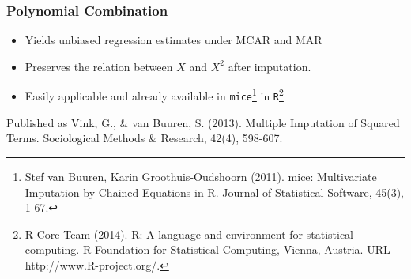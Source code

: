 \documentclass{beamer}
\begin{document}
\begin{frame}
  \frametitle{Polynomial Combination}
    \begin{itemize}
  \item Yields unbiased regression estimates under MCAR and MAR
  \item Preserves the relation between $X$ and $X^2$ after imputation. 
  \item Easily applicable and already available in \texttt{mice}\footnote{ \tiny Stef van Buuren, Karin Groothuis-Oudshoorn (2011). mice: Multivariate Imputation by Chained Equations in R. Journal of Statistical Software, 45(3), 1-67.} in \texttt{R}\footnote{ \tiny R Core Team (2014). R: A language and environment for statistical computing. R Foundation for Statistical Computing, Vienna, Austria. URL http://www.R-project.org/.}
  \end{itemize}
      \vspace{0.2 in}
\end{frame}
 
\begin{frame}
  Published as Vink, G., \& van Buuren, S. (2013). Multiple Imputation of Squared Terms. Sociological Methods \& Research, 42(4), 598-607.
 \end{frame}
\end{document}
